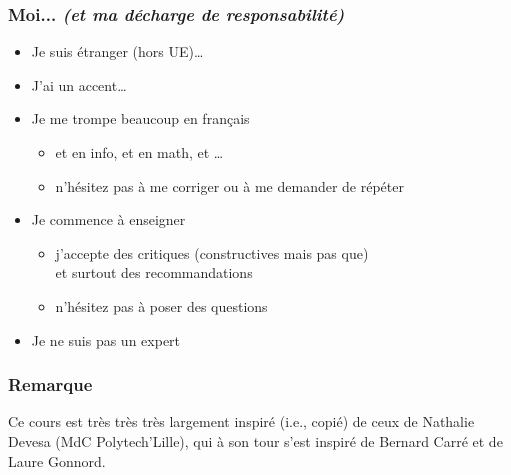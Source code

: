 \documentclass[12pt,svgnames]{beamer}
\subtitle{\Huge Introduction et Rappel}
\date{CM0}
\begin{document}
\begin{frame}
	\titlepage
\end{frame}


\begin{frame}
	\frametitle{Moi... \textit{\small (et ma décharge de responsabilité)}}
	\begin{itemize}
		\item Je suis étranger (hors UE)…
		\item J'ai un accent…
		\item Je me {\color{blue} trompe beaucoup} en français
		\begin{itemize}
			\item et en info, et en math, et \ldots
			\item n'hésitez pas à me corriger ou à me demander de répéter
		\end{itemize}
		\item Je commence à enseigner
		\begin{itemize}
			\item j'accepte des critiques (constructives mais pas que)\\
			et surtout des recommandations
			\item n'hésitez pas à poser des questions
		\end{itemize}
		\item Je ne suis pas un expert
	\end{itemize}
\end{frame}


\begin{frame}
	\frametitle{Remarque}
	\Large Ce cours est très très très largement inspiré (i.e., copié) de ceux de Nathalie Devesa (MdC Polytech'Lille), qui à son tour s'est inspiré de Bernard Carré et de Laure Gonnord.
\end{frame}
\end{document}
